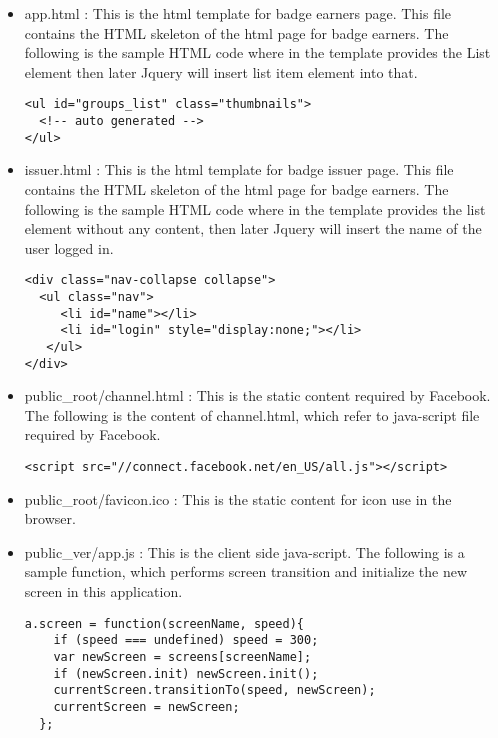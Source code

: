 \begin{itemize}
\item app.html : This is the html template for badge earners page. This file contains the HTML skeleton of the html page for badge earners. The following is the sample HTML code where in the template provides the List element then later Jquery will insert list item element into that.

\begin{lstlisting}
<ul id="groups_list" class="thumbnails">
  <!-- auto generated -->
</ul>  
\end{lstlisting}

\item issuer.html : This is the html template for badge issuer page. This file contains the HTML skeleton of the html page for badge earners. The following is the sample HTML code where in the template provides the list element without any content, then later Jquery will insert the name of the user logged in.

\begin{lstlisting}
<div class="nav-collapse collapse">
  <ul class="nav">
     <li id="name"></li>
     <li id="login" style="display:none;"></li>
   </ul>
</div>
\end{lstlisting}

\item public{\_}root/channel.html : This is the static content required by Facebook. The following is the content of channel.html, which refer to java-script file required by Facebook.

\begin{lstlisting}
<script src="//connect.facebook.net/en_US/all.js"></script>
\end{lstlisting}

\item public{\_}root/favicon.ico : This is the static content for icon use in the browser.
\item public{\_}ver/app.js : This is the client side java-script. The following is a sample function, which performs screen transition and initialize the new screen in this application.

\begin{lstlisting}
a.screen = function(screenName, speed){
    if (speed === undefined) speed = 300;
    var newScreen = screens[screenName];
    if (newScreen.init) newScreen.init();
    currentScreen.transitionTo(speed, newScreen);
    currentScreen = newScreen;
  };
\end{lstlisting}

\end{itemize}
